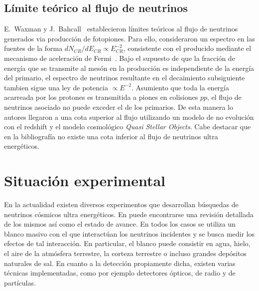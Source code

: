 	\subsection{L\'imite te\'orico al flujo de neutrinos}
	
	E.\ Waxman y J.\ Bahcall~\cite{cite:WaxmanBahcall1} establecieron l\'imites te\'oricos al flujo de neutrinos generados via producci\'on de fotopiones.
	Para ello, consideraron un espectro en las fuentes de la forma $dN_{CR}/dE_{CR}\propto E_{CR}^{-2}$, consistente con el producido mediante el mecanismo de aceleraci\'on de Fermi~\cite{cite:Waxman1}.
	Bajo el supuesto de que la fracci\'on de energ\'ia que se transmite al mes\'on en la producci\'on es independiente de la energ\'ia del primario, el espectro de neutrinos resultante en el decaimiento subsiguiente tambien sigue una ley de potencia $\propto E^{-2}$.
	Asumiento que toda la energ\'ia acarreada por los protones es transmitida a piones en colisiones $pp$, el flujo de neutrinos asociado no puede exceder el de los primarios.
	De esta manera lo autores llegaron a una cota superior al flujo utilizando un modelo de no evoluci\'on con el redshift y el modelo cosmol\'ogico \emph{Quasi Stellar Objects}.
	Cabe destacar que en la bibliograf\'ia no existe una cota inferior al flujo de neutrinos ultra energ\'eticos.
	
% 	
% 	
% 	

\section{Situación experimental}

En la actualidad existen diversos experimentos que desarrollan b\'usquedas de neutrinos c\'osmicos ultra energ\'eticos. 
En \cite{cite:nuSearchReview1} puede encontrarse una revisión detallada de los mismos as\'i como el estado de avance. 
En todos los casos se utiliza un blanco masivo con el que interact\'uan los neutrinos incidentes y se busca medir los efectos de tal interacci\'on.
En particular, el blanco puede consistir en agua, hielo, el aire de la atm\'osfera terrestre, la corteza terrestre o incluso grandes dep\'ositos naturales de sal.
En cuanto a la detecci\'on propiamente dicha, existen varias t\'ecnicas implementadas, como por ejemplo detectores \'opticos, de radio y de part\'iculas.

